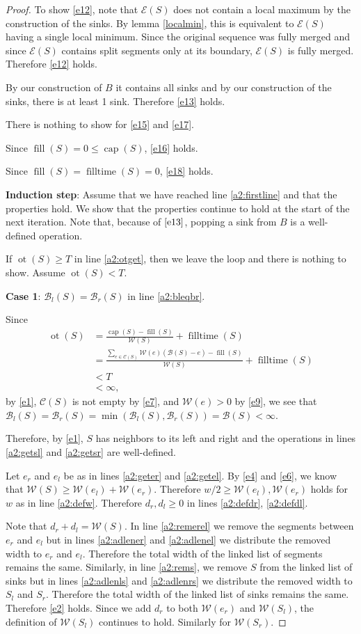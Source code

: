 \documentclass[11pt,a4paper]{article}
\newcommand{\Br}{\mathcal{B}_r}
\newcommand{\Bl}{\mathcal{B}_l}
\newcommand{\B}{\mathcal{B}}
\newcommand{\W}{\mathcal{W}}
\newcommand{\C}{\mathcal{C}}
\newcommand{\E}{\mathcal{E}}
\DeclareMathOperator{\capp}{cap}
\DeclareMathOperator{\ot}{ot}
\DeclareMathOperator{\Fill}{fill}
\DeclareMathOperator{\filltime}{filltime}
\begin{document}
\begin{proof}
To show \ref{e12}, note that $\E(S)$ does not contain a local maximum by the construction of the sinks.
By lemma \ref{localmin}, this is equivalent to $\E(S)$ having a single local minimum.
Since the original sequence was fully merged and since $\E(S)$ contains split segments only at its boundary, $\E(S)$ is fully merged.
Therefore \ref{e12} holds.

By our construction of $B$ it contains all sinks and by our construction of the sinks, there is at least 1 sink.
Therefore \ref{e13} holds.

There is nothing to show for \ref{e15} and \ref{e17}.

Since $\Fill(S) = 0 \le \capp(S)$, \ref{e16} holds.

Since $\Fill(S) = \filltime(S) = 0$, \ref{e18} holds.

\textbf{Induction step}: Assume that we have reached line \ref{a2:firstline} and that the properties hold.
We show that the properties continue to hold at the start of the next iteration.
Note that, because of $\ref{e13}$, popping a sink from $B$ is a well-defined operation.

If $\ot(S)\ge T$ in line \ref{a2:otget}, then we leave the loop and there is nothing to show.
Assume $\ot(S) < T$.

\textbf{Case 1}: $\Bl(S) = \Br(S)$ in line \ref{a2:bleqbr}.

Since 
\begin{align*}
    \ot(S) &= \frac{\capp(S) - \Fill(S)}{\W(S)} + \filltime(S) \\
           &= \frac{\sum_{e\in\C(S)} \W(e)(\B(S)-e) - \Fill(S)}{\W(S)} + \filltime(S) \\
           &< T \\
           &< \infty,
\end{align*}
by \ref{e1}, $\C(S)$ is not empty by \ref{e7}, and $\W(e) > 0$ by \ref{e9},
we see that $\Bl(S) = \Br(S) = \min(\Bl(S), \Br(S)) = \B(S) < \infty$.

Therefore, by \ref{e1}, $S$ has neighbors to its left and right and the operations in lines \ref{a2:getsl} and \ref{a2:getsr} are well-defined.

Let $e_r$ and $e_l$ be as in lines \ref{a2:geter} and \ref{a2:getel}.
By \ref{e4} and \ref{e6}, we know that $\W(S) \ge \W(e_l) + \W(e_r)$.
Therefore $w/2 \ge \W(e_l), \W(e_r)$ holds for $w$ as in line \ref{a2:defw}.
Therefore $d_r, d_l \ge 0$ in lines \ref{a2:defdr}, \ref{a2:defdl}.

Note that $d_r + d_l = \W(S)$.
In line \ref{a2:remerel} we remove the segments between $e_r$ and $e_l$ but in lines \ref{a2:adlener} and \ref{a2:adlenel} we distribute the removed width to $e_r$ and $e_l$.
Therefore the total width of the linked list of segments remains the same.
Similarly, in line \ref{a2:rems}, we remove $S$ from the linked list of sinks but in lines \ref{a2:adlenls} and \ref{a2:adlenrs} we distribute the removed width to $S_l$ and $S_r$.
Therefore the total width of the linked list of sinks remains the same.
Therefore \ref{e2} holds.
Since we add $d_r$ to both $\W(e_r)$ and $\W(S_l)$, the definition of $\W(S_l)$ continues to hold.
Similarly for $\W(S_r)$.


\end{proof}
\end{document}
